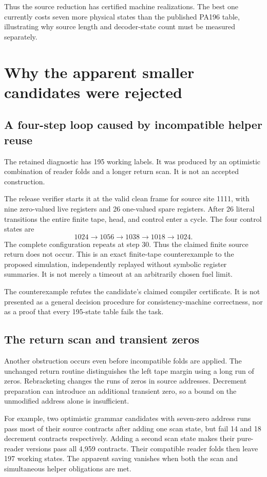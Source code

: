 \documentclass[11pt,letterpaper]{article}
\begin{document}
Thus the source reduction has certified machine realizations. The best one
currently costs seven more physical states than the published PA196 table,
illustrating why source length and decoder-state count must be measured
separately.

\section{Why the apparent smaller candidates were rejected}
\label{sec:negative}
\subsection{A four-step loop caused by incompatible helper reuse}
The retained diagnostic
has 195 working labels. It was produced by an optimistic combination of
reader folds and a longer return scan. It is not an accepted construction.

The release verifier starts it at the valid clean frame for source site
1111, with nine zero-valued live registers and 26 one-valued spare registers.
After 26 literal transitions the entire finite tape, head, and control enter
a cycle. The four control states are
\[
              1024\longrightarrow1056\longrightarrow1038
                   \longrightarrow1018\longrightarrow1024.
\]
The complete configuration repeats at step 30. Thus the claimed finite
source return does not occur. This is an exact finite-tape counterexample to
the proposed simulation, independently replayed without symbolic register
summaries. It is not merely a timeout at an arbitrarily chosen fuel limit.

The counterexample refutes the candidate's claimed compiler certificate.
It is not presented as a general decision procedure for consistency-machine
correctness, nor as a proof that every 195-state table fails the task.

\subsection{The return scan and transient zeros}
Another obstruction occurs even before incompatible folds are applied.
The unchanged return routine distinguishes the left tape margin using a
long run of zeros. Rebracketing changes the runs of zeros in source
addresses. Decrement preparation can introduce an additional transient zero,
so a bound on the unmodified address alone is insufficient.

For example, two optimistic grammar candidates with seven-zero address runs
pass most of their source contracts after adding one scan state, but fail
14 and 18 decrement contracts respectively. Adding a second scan state makes
their pure-reader versions pass all 4,959 contracts. Their compatible reader
folds then leave 197 working states. The apparent saving vanishes when both
the scan and simultaneous helper obligations are met.
\end{document}
